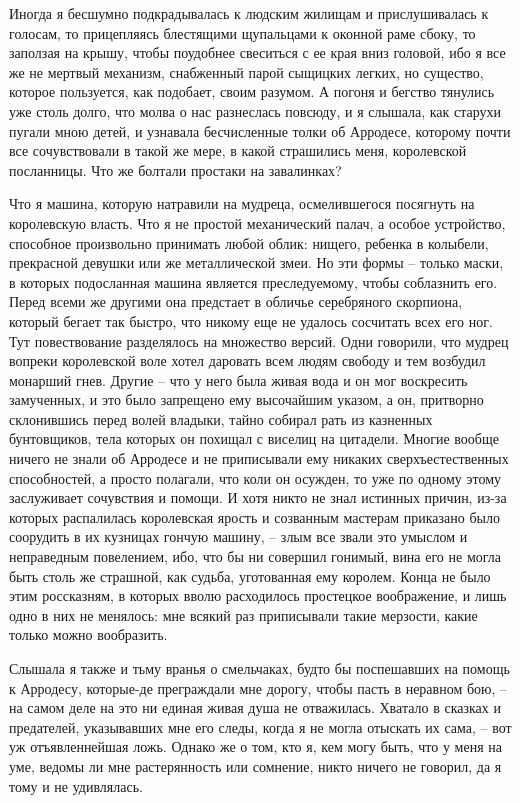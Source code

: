Иногда я бесшумно подкрадывалась к людским жилищам и  прислушивалась  к
голосам,  то  прицепляясь  блестящими  щупальцами  к  оконной раме сбоку, то
заползая на крышу, чтобы поудобнее свеситься с ее края вниз головой,  ибо  я
все  же  не мертвый механизм, снабженный парой сыщицких легких, но существо,
которое пользуется, как подобает, своим разумом. А погоня и бегство тянулись
уже столь долго, что молва о  нас  разнеслась  повсюду,  и  я  слышала,  как
старухи  пугали  мною  детей,  и  узнавала  бесчисленные  толки об Арродесе,
которому почти все сочувствовали в такой же мере, в какой  страшились  меня,
королевской посланницы. Что же болтали простаки на завалинках?

Что  я машина, которую натравили на мудреца, осмелившегося посягнуть на
королевскую  власть.  Что  я  не  простой  механический  палач,   а   особое
устройство,  способное  произвольно принимать любой облик: нищего, ребенка в
колыбели, прекрасной девушки или же металлической  змеи.  Но  эти  формы  --
только  маски,  в  которых  подосланная машина является преследуемому, чтобы
соблазнить его. Перед всеми же другими она предстает в  обличье  серебряного
скорпиона,  который  бегает  так быстро, что никому еще не удалось сосчитать
всех его ног.  Тут  повествование  разделялось  на  множество  версий.  Одни
говорили,  что  мудрец  вопреки  королевской  воле хотел даровать всем людям
свободу и тем возбудил монарший гнев. Другие -- что у него была живая вода и
он мог воскресить замученных, и это было запрещено ему высочайшим указом,  а
он,  притворно  склонившись  перед  волей  владыки,  тайно  собирал  рать из
казненных бунтовщиков, тела которых он похищал с виселиц на цитадели. Многие
вообще  ничего  не  знали  об  Арродесе  и  не   приписывали   ему   никаких
сверхъестественных  способностей, а просто полагали, что коли он осужден, то
уже по одному этому заслуживает сочувствия и помощи. И хотя  никто  не  знал
истинных  причин,  из-за  которых распалилась королевская ярость и созванным
мастерам приказано было соорудить в их кузницах гончую машину, --  злым  все
звали это умыслом и неправедным повелением, ибо, что бы ни совершил гонимый,
вина  его  не  могла  быть  столь  же  страшной, как судьба, уготованная ему
королем.  Конца  не  было  этим  россказням,  в  которых  вволю  расходилось
простецкое  воображение,  и  лишь  одно  в  них  не менялось: мне всякий раз
приписывали такие мерзости, какие только можно вообразить.

Слышала я также и тьму вранья о смельчаках,  будто  бы  поспешавших  на
помощь к Арродесу, которые-де преграждали мне дорогу, чтобы пасть в неравном
бою,  --  на самом деле на это ни единая живая душа не отважилась. Хватало в
сказках и предателей, указывавших мне его следы, когда я не  могла  отыскать
их  сама,  --  вот  уж отъявленнейшая ложь. Однако же о том, кто я, кем могу
быть, что у меня на уме, ведомы ли мне  растерянность  или  сомнение,  никто
ничего не говорил, да я тому и не удивлялась.

